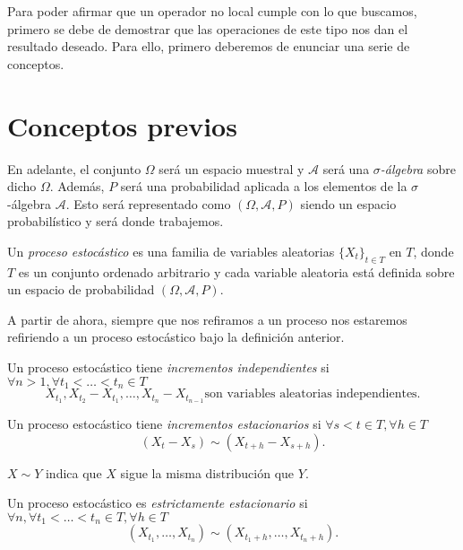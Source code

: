 Para poder afirmar que un operador no local cumple con lo que buscamos, primero se debe de demostrar que las operaciones de este tipo nos dan el resultado deseado. Para ello, primero deberemos de enunciar una serie de conceptos.

\section{Conceptos previos}
En adelante, el conjunto $\Omega$ será un espacio muestral y $\mathscr{A}$ será una \emph{$\sigma$-álgebra} sobre dicho $\Omega$. Además, $P$ será una probabilidad aplicada a los elementos de la $\sigma$-álgebra $\mathscr{A}$. Esto será representado como $(\Omega,\mathscr{A},P)$ siendo un espacio probabilístico y será donde trabajemos.

\begin{definicion}\label{def:pe}
  Un \emph{proceso estocástico} es una familia de variables aleatorias ${\{X_t\}}_{t \in T}$ en $T$, donde $T$ es un conjunto ordenado arbitrario y cada variable aleatoria está definida sobre un espacio de probabilidad $(\Omega, \mathscr{A}, P)$.
\end{definicion}

A partir de ahora, siempre que nos refiramos a un proceso nos estaremos refiriendo a un proceso estocástico bajo la definición anterior. \\

\begin{definicion}
  Un proceso estocástico tiene \emph{incrementos independientes} si $\forall n > 1, \forall t_1 < \ldots < t_n \in T$ $$X_{t_1}, X_{t_2} - X_{t_1}, \ldots, X_{t_n} - X_{t_{n-1}} \text{son variables aleatorias independientes.}$$
\end{definicion}

\begin{definicion}
  Un proceso estocástico tiene \emph{incrementos estacionarios} si $\forall s < t \in T, \forall h\in T$  $$(X_t - X_s) \sim (X_{t+h} - X_{s+h}).$$
\end{definicion}

\begin{nota}
  $X \sim Y$ indica que $X$ sigue la misma distribución que $Y$.
\end{nota}

\begin{definicion}
  Un proceso estocástico es \emph{estrictamente estacionario} si $\forall n, \forall t_1 < \ldots < t_n \in T, \forall h \in T$ $$(X_{t_1}, \ldots, X_{t_n}) \sim (X_{t_1 + h}, \ldots, X_{t_n + h}).$$
\end{definicion}

